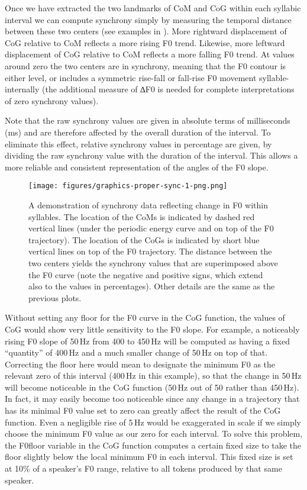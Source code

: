 Once we have extracted the two landmarks of CoM and CoG within each syllabic interval we can compute synchrony simply by measuring the temporal distance between these two centers (see examples in ). 
More rightward displacement of CoG relative to CoM reflects a more rising F0 trend. Likewise, more leftward displacement of CoG relative to CoM reflects a more falling F0 trend.
At values around zero the two centers are in synchrony, meaning that the F0 contour is either level, or includes a symmetric rise-fall or fall-rise F0 movement syllable-internally (the additional measure of ∆F0 is needed for complete interpretations of zero synchrony values).

Note that the raw synchrony values are given in absolute terms of milliseconds (ms) and are therefore affected by the overall duration of the interval. To eliminate this effect, relative synchrony values in percentage are given, by dividing the raw synchrony value with the duration of the interval. This allows a more reliable and consistent representation of the angles of the F0 slope.

\begin{figure}
\texttt{[image: figures/graphics-proper-sync-1-png.png]} 
\caption{A demonstration of synchrony data reflecting change in F0 within syllables. The location of the CoMs is indicated by dashed red vertical lines (under the periodic energy curve and on top of the F0 trajectory). The location of the CoGs is indicated by short blue vertical lines on top of the F0 trajectory. The distance between the two centers yields the synchrony values that are superimposed above the F0 curve (note the negative and positive signs, which extend also to the values in percentages). Other details are the same as the previous plots.}\label{fig:proper-sync}
\end{figure}

Without setting any floor for the F0 curve in the CoG function, the values of CoG would show very little sensitivity to the F0 slope. For example, a noticeably rising F0 slope of 50\,Hz from 400 to 450\,Hz will be computed as having a fixed “quantity” of 400\,Hz and a much smaller change of 50\,Hz on top of that. Correcting the floor here would mean to designate the minimum F0 as the relevant zero of this interval (400\,Hz in this example), so that the change in 50\,Hz will become noticeable in the CoG function (50\,Hz out of 50 rather than 450\,Hz). In fact, it may easily become too noticeable since any change in a trajectory that has its minimal F0 value set to zero can greatly affect the result of the CoG function. Even a negligible rise of 5\,Hz would be exaggerated in scale if we simply choose the minimum F0 value as our zero for each interval. To solve this problem, the F0floor variable in the CoG function computes a certain fixed size to take the floor slightly below the local minimum F0 in each interval. This fixed size is set at 10\% of a speaker's F0 range, relative to all tokens produced by that same speaker.

